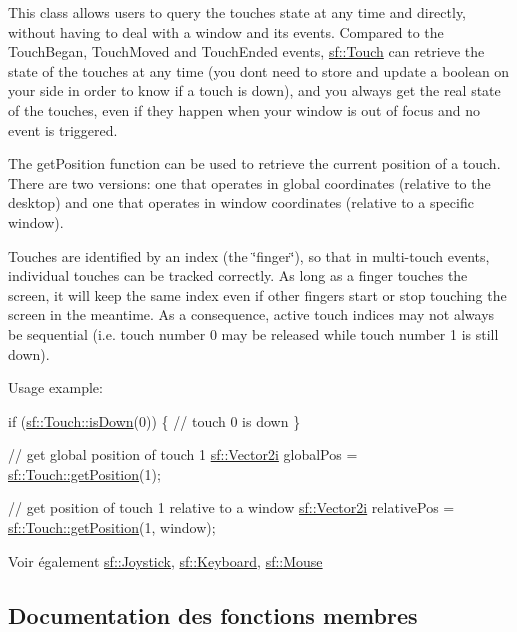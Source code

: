 This class allows users to query the touches state at any time and directly, without having to deal with a window and its events. Compared to the Touch\+Began, Touch\+Moved and Touch\+Ended events, \hyperlink{classsf_1_1Touch}{sf\+::\+Touch} can retrieve the state of the touches at any time (you don\textquotesingle{}t need to store and update a boolean on your side in order to know if a touch is down), and you always get the real state of the touches, even if they happen when your window is out of focus and no event is triggered.

The get\+Position function can be used to retrieve the current position of a touch. There are two versions\+: one that operates in global coordinates (relative to the desktop) and one that operates in window coordinates (relative to a specific window).

Touches are identified by an index (the \char`\"{}finger\char`\"{}), so that in multi-\/touch events, individual touches can be tracked correctly. As long as a finger touches the screen, it will keep the same index even if other fingers start or stop touching the screen in the meantime. As a consequence, active touch indices may not always be sequential (i.\+e. touch number 0 may be released while touch number 1 is still down).

Usage example\+: 
\begin{DoxyCode}
\textcolor{keywordflow}{if} (\hyperlink{classsf_1_1Touch_a2f85297123ea4e401d02c346e50d48a3}{sf::Touch::isDown}(0))
\{
    \textcolor{comment}{// touch 0 is down}
\}

\textcolor{comment}{// get global position of touch 1}
\hyperlink{classsf_1_1Vector2}{sf::Vector2i} globalPos = \hyperlink{classsf_1_1Touch_af1b7035be709091c7475075e43e2bc23}{sf::Touch::getPosition}(1);

\textcolor{comment}{// get position of touch 1 relative to a window}
\hyperlink{classsf_1_1Vector2}{sf::Vector2i} relativePos = \hyperlink{classsf_1_1Touch_af1b7035be709091c7475075e43e2bc23}{sf::Touch::getPosition}(1, window);
\end{DoxyCode}


\begin{DoxySeeAlso}{Voir également}
\hyperlink{classsf_1_1Joystick}{sf\+::\+Joystick}, \hyperlink{classsf_1_1Keyboard}{sf\+::\+Keyboard}, \hyperlink{classsf_1_1Mouse}{sf\+::\+Mouse} 
\end{DoxySeeAlso}


\subsection{Documentation des fonctions membres}
\mbox{\label{classsf_1_1Touch_af1b7035be709091c7475075e43e2bc23}} 
